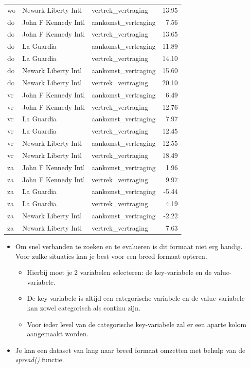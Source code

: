 \documentclass[]{tufte-book}
\providecommand{\tightlist}{%
  \setlength{\itemsep}{0pt}\setlength{\parskip}{0pt}}
\begin{document}
\begin{table}
\begin{tabular}[t]{lllr}
wo & Newark Liberty Intl & vertrek\_vertraging & 13.95\\
do & John F Kennedy Intl & aankomst\_vertraging & 7.56\\
\addlinespace
do & John F Kennedy Intl & vertrek\_vertraging & 13.65\\
do & La Guardia & aankomst\_vertraging & 11.89\\
do & La Guardia & vertrek\_vertraging & 14.10\\
do & Newark Liberty Intl & aankomst\_vertraging & 15.60\\
do & Newark Liberty Intl & vertrek\_vertraging & 20.10\\
\addlinespace
vr & John F Kennedy Intl & aankomst\_vertraging & 6.49\\
vr & John F Kennedy Intl & vertrek\_vertraging & 12.76\\
vr & La Guardia & aankomst\_vertraging & 7.97\\
vr & La Guardia & vertrek\_vertraging & 12.45\\
vr & Newark Liberty Intl & aankomst\_vertraging & 12.55\\
\addlinespace
vr & Newark Liberty Intl & vertrek\_vertraging & 18.49\\
za & John F Kennedy Intl & aankomst\_vertraging & 1.96\\
za & John F Kennedy Intl & vertrek\_vertraging & 9.97\\
za & La Guardia & aankomst\_vertraging & -5.44\\
za & La Guardia & vertrek\_vertraging & 4.19\\
\addlinespace
za & Newark Liberty Intl & aankomst\_vertraging & -2.22\\
za & Newark Liberty Intl & vertrek\_vertraging & 7.63\\
\bottomrule
\end{tabular}
\end{table}

\begin{itemize}
\tightlist
\item
  Om snel verbanden te zoeken en te evalueren is dit formaat niet erg handig. Voor zulke situaties kan je best voor een breed formaat opteren.

  \begin{itemize}
  \tightlist
  \item
    Hierbij moet je 2 variabelen selecteren: de key-variabele en de value-variabele.
  \item
    De key-variabele is altijd een categorische variabele en de value-variabele kan zowel categorisch als continu zijn.
  \item
    Voor ieder level van de categorische key-variabele zal er een aparte kolom aangemaakt worden.
  \end{itemize}
\item
  Je kan een dataset van lang naar breed formaat omzetten met behulp van de \emph{spread()} functie.
\end{itemize}
\end{document}
